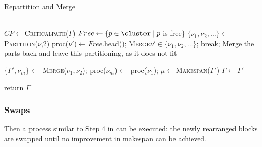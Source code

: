 \documentclass[11pt]{article}
\begin{document}
    \begin{algorithm}[h!]
        \caption{Repartition and Merge}
        \label{alg:RepartitionMerge}
        \begin{algorithmic}[1]
                \\
                \State $CP \gets $\textsc{Criticalpath}($\Gamma$) \label{line:cp}
                \State $Free \gets \{ p \in \cluster \mid p$ is free$\}$
                    \label{line:whilefree}
                        \State $\{ \nu_1, \nu_2,\dots\}\gets$\textsc{Partition}($\nu$,2) \label{line:repartition}
                                \State proc($\nu'$)$\gets Free.$head();
                            \Else
                                \label{line:ifnotfits}
                                \State \textsc{Merge}$\nu' \in \{ \nu_1, \nu_2,\dots\}$; break;
                                \Comment Merge the parts back and leave this partitioning, as it does not fit
                            \EndIf
                        \EndFor
                    \EndFor
                \EndWhile

                    \label{line:neighbblocks}
                    \State $\{\Gamma', \nu_m\} \gets $ \textsc{Merge}($\nu_1, \nu_2$); proc($\nu_m$)$\gets $ proc($\nu_1$);
                    \State $\mu \gets $\textsc{Makespan}($\Gamma'$)
                        \State $\Gamma \gets \Gamma'$
                    \EndIf
                \EndFor

                \State return $\Gamma$
            \EndProcedure
        \end{algorithmic}
    \end{algorithm}

    \subsubsection{Swaps}

    Then a process similar to Step 4 in %
    can be executed: the newly rearranged blocks are swapped until no
    improvement in makespan can be achieved.
\end{document}
